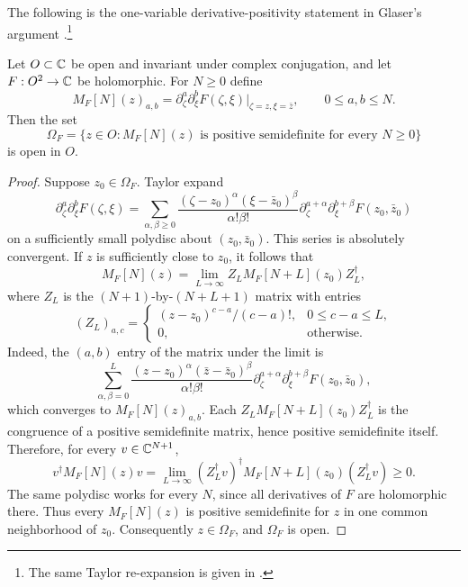 The following is the one-variable derivative-positivity statement
in Glaser's argument \cite[\S3, p.~14]{Glaser1969}.\footnote{The same
Taylor re-expansion is given in \cite[Appendix~C, (145)--(146)]{BEM1998}.}
\begin{theorem}\label{thm:analytic-open}
Let $O\subset\mathbb{C}$ be open and invariant under complex conjugation,
and let $F:O^2\to\mathbb{C}$ be holomorphic. For $N\geq0$ define
\begin{equation}
 M_F[N](z)_{a,b}
 =\partial_\zeta^a\partial_\xi^bF(\zeta,\xi)
      \Big|_{\zeta=z,\xi=\bar z},\qquad0\leq a,b\leq N.
\end{equation}
Then the set
\begin{equation}
 \Omega_F=\{z\in O:M_F[N](z)\text{ is positive semidefinite
 for every }N\geq0\}
\end{equation}
is open in $O$.
\end{theorem}
\begin{proof}
Suppose $z_0\in\Omega_F$. Taylor expand
\begin{equation}
 \partial_\zeta^a\partial_\xi^bF(\zeta,\xi)
 =\sum_{\alpha,\beta\geq0}
 \frac{(\zeta-z_0)^\alpha(\xi-\bar z_0)^\beta}{\alpha!\beta!}
 \partial_\zeta^{a+\alpha}\partial_\xi^{b+\beta}F(z_0,\bar z_0)
\end{equation}
on a sufficiently small polydisc about $(z_0,\bar z_0)$.
This series is absolutely convergent. If $z$ is sufficiently close
to $z_0$, it follows that
\begin{equation}\label{eq:Taylor-matrices}
 M_F[N](z)=\lim_{L\to\infty}Z_LM_F[N+L](z_0)Z_L^\dagger,
\end{equation}
where $Z_L$ is the $(N+1)$-by-$(N+L+1)$ matrix with entries
\begin{equation}
 (Z_L)_{a,c}=\begin{cases}
 (z-z_0)^{c-a}/(c-a)!,&0\leq c-a\leq L,\\
 0,&\text{otherwise}.
 \end{cases}
\end{equation}
Indeed, the $(a,b)$ entry of the matrix under the limit is
\begin{equation}
 \sum_{\alpha,\beta=0}^L
 \frac{(z-z_0)^\alpha(\bar z-\bar z_0)^\beta}{\alpha!\beta!}
 \partial_\zeta^{a+\alpha}\partial_\xi^{b+\beta}F(z_0,\bar z_0),
\end{equation}
which converges to $M_F[N](z)_{a,b}$.
Each $Z_LM_F[N+L](z_0)Z_L^\dagger$ is the congruence of a positive
semidefinite matrix, hence positive semidefinite itself. Therefore,
for every $v\in\mathbb{C}^{N+1}$,
\begin{equation}
 v^\dagger M_F[N](z)v
 =\lim_{L\to\infty}(Z_L^\dagger v)^\dagger
       M_F[N+L](z_0)(Z_L^\dagger v)\geq0.
\end{equation}
The same polydisc works for every $N$, since all derivatives of $F$
are holomorphic there. Thus every $M_F[N](z)$ is positive
semidefinite for $z$ in one common neighborhood of $z_0$.
Consequently $z\in\Omega_F$, and $\Omega_F$ is open.
\end{proof}


